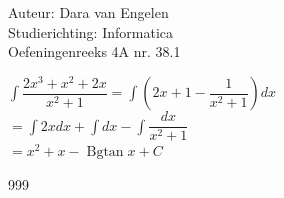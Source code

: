 \documentclass[a4paper]{article}
\begin{document}
  
\noindent \large Auteur: Dara van Engelen \\
\noindent \large Studierichting: Informatica\\
\noindent \large Oefeningenreeks 4A nr. 38.1\\

\medskip

\normalsize

$\displaystyle\int \dfrac{2x^3 + x^2 + 2x}{x^2+1} = \displaystyle\int \left( 2x+1  - \dfrac{1}{x^2+1}\right)dx$\\ 

$ = \displaystyle\int2xdx + \displaystyle\int dx - \displaystyle\int \dfrac{dx}{x^2+1}$\\

$= x^2 + x - \operatorname{Bgtan} x +C$\\

\begin{thebibliography}{999}
\end{thebibliography}
\end{document}
